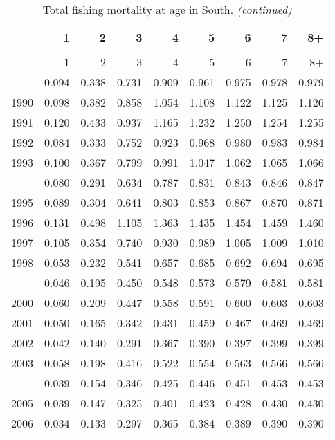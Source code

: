 \documentclass[
]{article}
\begin{document}
\begin{longtable}[t]{lrrrrrrrr}
\caption{\label{tab:South-region-FAA-table}Total fishing mortality at age in South.}\\
\toprule
  & 1 & 2 & 3 & 4 & 5 & 6 & 7 & 8+\\
\midrule
\endfirsthead
\caption[]{Total fishing mortality at age in South. \textit{(continued)}}\\
\toprule
  & 1 & 2 & 3 & 4 & 5 & 6 & 7 & 8+\\
\midrule
\endhead

\endfoot
\bottomrule
\endlastfoot
1989 & 0.094 & 0.338 & 0.731 & 0.909 & 0.961 & 0.975 & 0.978 & 0.979\\
1990 & 0.098 & 0.382 & 0.858 & 1.054 & 1.108 & 1.122 & 1.125 & 1.126\\
1991 & 0.120 & 0.433 & 0.937 & 1.165 & 1.232 & 1.250 & 1.254 & 1.255\\
1992 & 0.084 & 0.333 & 0.752 & 0.923 & 0.968 & 0.980 & 0.983 & 0.984\\
1993 & 0.100 & 0.367 & 0.799 & 0.991 & 1.047 & 1.062 & 1.065 & 1.066\\
\addlinespace
1994 & 0.080 & 0.291 & 0.634 & 0.787 & 0.831 & 0.843 & 0.846 & 0.847\\
1995 & 0.089 & 0.304 & 0.641 & 0.803 & 0.853 & 0.867 & 0.870 & 0.871\\
1996 & 0.131 & 0.498 & 1.105 & 1.363 & 1.435 & 1.454 & 1.459 & 1.460\\
1997 & 0.105 & 0.354 & 0.740 & 0.930 & 0.989 & 1.005 & 1.009 & 1.010\\
1998 & 0.053 & 0.232 & 0.541 & 0.657 & 0.685 & 0.692 & 0.694 & 0.695\\
\addlinespace
1999 & 0.046 & 0.195 & 0.450 & 0.548 & 0.573 & 0.579 & 0.581 & 0.581\\
2000 & 0.060 & 0.209 & 0.447 & 0.558 & 0.591 & 0.600 & 0.603 & 0.603\\
2001 & 0.050 & 0.165 & 0.342 & 0.431 & 0.459 & 0.467 & 0.469 & 0.469\\
2002 & 0.042 & 0.140 & 0.291 & 0.367 & 0.390 & 0.397 & 0.399 & 0.399\\
2003 & 0.058 & 0.198 & 0.416 & 0.522 & 0.554 & 0.563 & 0.566 & 0.566\\
\addlinespace
2004 & 0.039 & 0.154 & 0.346 & 0.425 & 0.446 & 0.451 & 0.453 & 0.453\\
2005 & 0.039 & 0.147 & 0.325 & 0.401 & 0.423 & 0.428 & 0.430 & 0.430\\
2006 & 0.034 & 0.133 & 0.297 & 0.365 & 0.384 & 0.389 & 0.390 & 0.390\\

\end{longtable}
\end{document}
